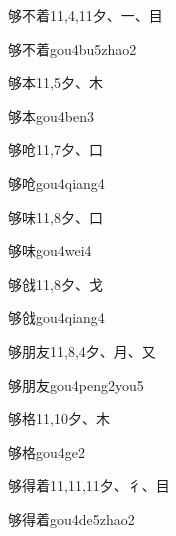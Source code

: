 \begin{entry}{够不着}{11,4,11}{⼣、⼀、⽬}
  \begin{phonetics}{够不着}{gou4bu5zhao2}
  \end{phonetics}
\end{entry}

\begin{entry}{够本}{11,5}{⼣、⽊}
  \begin{phonetics}{够本}{gou4ben3}
  \end{phonetics}
\end{entry}

\begin{entry}{够呛}{11,7}{⼣、⼝}
  \begin{phonetics}{够呛}{gou4qiang4}
  \end{phonetics}
\end{entry}

\begin{entry}{够味}{11,8}{⼣、⼝}
  \begin{phonetics}{够味}{gou4wei4}
  \end{phonetics}
\end{entry}

\begin{entry}{够戗}{11,8}{⼣、⼽}
  \begin{phonetics}{够戗}{gou4qiang4}
  \end{phonetics}
\end{entry}

\begin{entry}{够朋友}{11,8,4}{⼣、⽉、⼜}
  \begin{phonetics}{够朋友}{gou4peng2you5}
  \end{phonetics}
\end{entry}

\begin{entry}{够格}{11,10}{⼣、⽊}
  \begin{phonetics}{够格}{gou4ge2}
  \end{phonetics}
\end{entry}

\begin{entry}{够得着}{11,11,11}{⼣、⼻、⽬}
  \begin{phonetics}{够得着}{gou4de5zhao2}
  \end{phonetics}
\end{entry}

